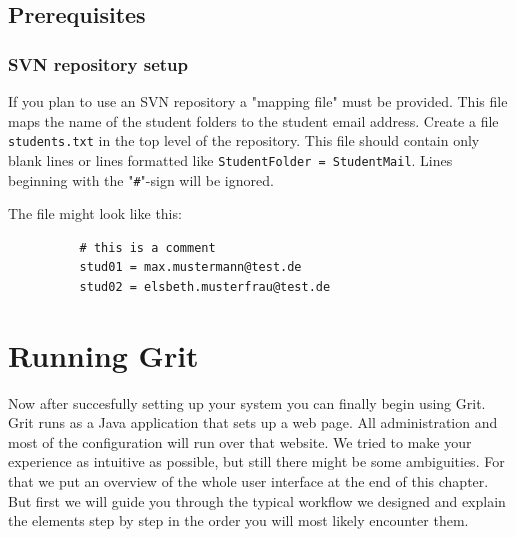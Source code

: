 \documentclass[10pt,a4paper, titlepage, toc=idx]{scrreprt}
\theoremstyle{definition}
\theoremstyle{plain}
\newcommand*{\product}{Grit}
\begin{document}
        \section{Prerequisites}


        \subsection{SVN repository setup}
        If you plan to use an SVN repository a "mapping file" must
        be provided. This file maps the name of the student folders to
        the student email address. Create a file \texttt{students.txt}
        in the top level of the repository. This file should contain
        only blank lines or lines formatted like \texttt{StudentFolder
          = StudentMail}. Lines beginning with the
        "\texttt{\#}"-sign will be ignored.

        The file might look like this:
\begin{lstlisting}
          # this is a comment
          stud01 = max.mustermann@test.de
          stud02 = elsbeth.musterfrau@test.de
\end{lstlisting}

    
       
	\chapter{Running \product}
	Now after succesfully setting up your system you can finally
        begin using \product. \product{} runs as a Java application
        that sets up a web page. All administration and most of the
        configuration will run over that website. We tried to make
        your experience as intuitive as possible, but still there
        might be some ambiguities. For that we put an overview of the
        whole user interface at the end of this chapter. But first we
        will guide you through the typical workflow we designed and
        explain the elements step by step in the order you will most
        likely encounter them.
\end{document}
